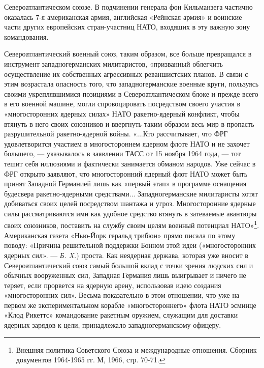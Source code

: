 \documentclass[12pt, a4paper, openany]{book}
\begin{document}
Североатлантическом союзе. В подчинении генерала фон Кильманзега частично оказалась 7-я американская армия, английская «Рейнская армия» и воинские части других европейских стран-участниц НАТО, входящих в эту важную зону командования.
	
	Североатлантический военный союз, таким образом, все больше превращался в инструмент западногерманских милитаристов, «призванный облегчить осуществление их собственных агрессивных реваншистских планов. В связи с этим возрастала опасность того, что западногерманские военные круги, пользуясь своими укреплявшимися позициями в Североатлантическом блоке и прежде всего в его военной машине, могли спровоцировать посредством своего участия в «многосторонних ядерных силах» НАТО ракетно-ядерный конфликт, чтобы втянуть в него своих союзников и ввергнуть таким образом весь мир в пропасть разрушительной ракетно-ядерной войны. «...Кто рассчитывает, что ФРГ удовлетворится участием в многостороннем ядерном флоте НАТО и не захочет большего, — указывалось в заявлении ТАСС от 15 ноября 1964 года, — тот тешит себя иллюзиями и фактически занимается обманом народов. Уже сейчас в ФРГ открыто заявляют, что многосторонний ядерный флот НАТО может быть принят Западной Германией лишь как «первый этап» в программе оснащения будесвера ракетно-ядерными средствами... Западногерманские милитаристы хотят добиваться своих целей посредством шантажа и угроз. Многосторонние ядерные силы рассматриваются ими как удобное средство втянуть в затеваемые авантюры своих союзников, поставить на службу своим целям военный потенциал НАТО»{\footnote{Внешняя политика Советского Союза и международные отношения. Сборник документов 1964-1965 гг. М, 1966, стр. 70-71.}}. Американская газета «Нью-Йорк геральд трибюн» прямо писала по этому поводу: «Причина решительной поддержки Бонном этой идеи («многосторонних ядерных сил». — \textit{Б. X.}) проста. Как неядерная держава, которая уже вносит в Североатлантический союз самый большой вклад с точки зрения людских сил и обычных вооруженных сил, Западная Германия лишь выигрывает и ничего не теряет, если прорвется на ядерную арену, использовав идею создания «многосторонних сил». Весьма показательно в этом отношении, что уже на первом же экспериментальном корабле «многостороннего» флота НАТО эсминце «Клод Рикеттс» командование ракетным оружием, служащим для доставки ядерных зарядов к цели, принадлежало западногерманскому офицеру.
	
	
	
\end{document}

